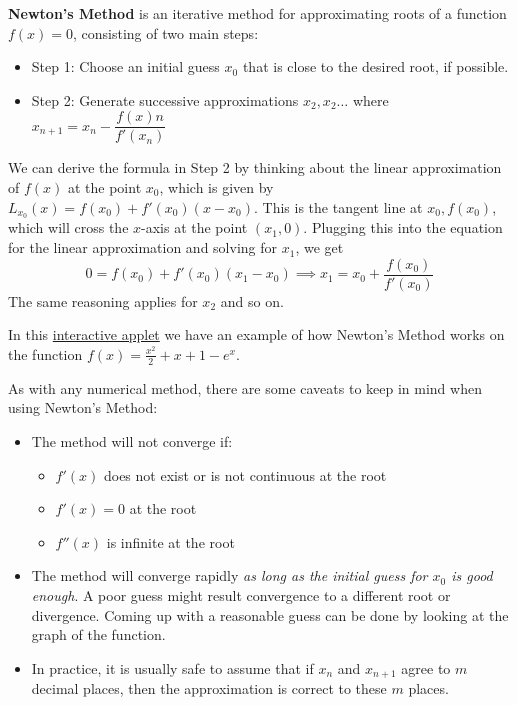 \documentclass[
]{book}
\providecommand{\tightlist}{%
  \setlength{\itemsep}{0pt}\setlength{\parskip}{0pt}}
\theoremstyle{definition}
\theoremstyle{definition}
\theoremstyle{definition}
\theoremstyle{definition}
\theoremstyle{remark}
\begin{document}
\textbf{Newton's Method} is an iterative method for approximating roots of a function \(f(x)=0\), consisting of two main steps:

\begin{itemize}
\tightlist
\item
  Step 1: Choose an initial guess \(x_0\) that is close to the desired root, if possible.
\item
  Step 2: Generate successive approximations \(x_2, x_2\ldots\) where \(x_{n+1}=x_n-\dfrac{f(x)n}{f'(x_n)}\)
\end{itemize}

We can derive the formula in Step 2 by thinking about the linear approximation of \(f(x)\) at the point \(x_0\), which is given by \(L_{x_0}(x)=f(x_0)+f'(x_0)(x-x_0)\). This is the tangent line at \(x_0, f(x_0)\), which will cross the \(x\)-axis at the point \((x_1,0)\). Plugging this into the equation for the linear approximation and solving for \(x_1\), we get \[0=f(x_0)+f'(x_0)(x_1-x_0) \implies x_1=x_0+\dfrac{f(x_0)}{f'(x_0)}\] The same reasoning applies for \(x_2\) and so on.

In this \href{https://www.geogebra.org/m/ak4jpfjz}{interactive applet} we have an example of how Newton's Method works on the function \(f(x)=\frac{x^2}{2}+x+1-e^x\).

As with any numerical method, there are some caveats to keep in mind when using Newton's Method:

\begin{itemize}
\tightlist
\item
  The method will not converge if:

  \begin{itemize}
  \tightlist
  \item
    \(f'(x)\) does not exist or is not continuous at the root
  \item
    \(f'(x)=0\) at the root
  \item
    \(f''(x)\) is infinite at the root
  \end{itemize}
\item
  The method will converge rapidly \emph{as long as the initial guess for \(x_0\) is good enough}. A poor guess might result convergence to a different root or divergence. Coming up with a reasonable guess can be done by looking at the graph of the function.
\item
  In practice, it is usually safe to assume that if \(x_n\) and \(x_{n+1}\) agree to \(m\) decimal places, then the approximation is correct to these \(m\) places.
\end{itemize}
\end{document}
